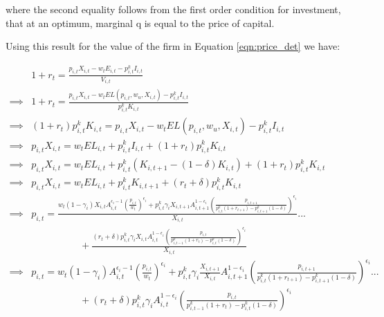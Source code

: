 \documentclass[letterpaper,12pt]{article}
\theoremstyle{definition}
\begin{document}
\begin{spacing}{1.5}
\noindent\noindent where the second equality follows from the first order condition for investment, that at an optimum, marginal q is equal to the price of capital.


Using this result for the value of the firm in Equation \ref{eqn:price_det} we have:

\begin{equation}
\label{eqn:price_det2}
\begin{split}
&  1+r_{t} = \frac{ p_{i,t}X_{i,t} - w_{t}E_{i,t} - p^{k}_{i,t}I_{i,t}}{V_{i,t}} \\
\implies & 1+r_{t} =  \frac{ p_{i,t}X_{i,t} - w_{t}EL(p_{i,t},w_{u},X_{i,t}) - p^{k}_{i,t}I_{i,t}}{p^{k}_{i,t}K_{i,t}} \\
\implies & (1+r_{t})p^{k}_{i,t}K_{i,t} =  p_{i,t}X_{i,t} - w_{t}EL(p_{i,t},w_{u},X_{i,t}) - p^{k}_{i,t}I_{i,t} \\
\implies & p_{i,t}X_{i,t} = w_{t}EL_{i,t} + p^{k}_{i,t}I_{i,t} +  (1+r_{t})p^{k}_{i,t}K_{i,t} \\
\implies & p_{i,t}X_{i,t} = w_{t}EL_{i,t}+ p^{k}_{i,t}(K_{i,t+1} - (1-\delta)K_{i,t}) +  (1+r_{t})p^{k}_{i,t}K_{i,t} \\
\implies & p_{i,t}X_{i,t} = w_{t}EL_{i,t} + p^{k}_{i,t}K_{i,t+1}+  (r_{t}+\delta)p^{k}_{i,t}K_{i,t} \\
\implies & p_{i,t}= \frac{w_{t}(1-\gamma_{i})X_{i,t}A_{i,t}^{\epsilon_{i}-1}\left( \frac{ p_{i,t}}{w_{t}}\right)^{\epsilon_{i}} + p^{k}_{i,t} \gamma_{i}X_{i,t+1}A_{i,t+1}^{1-\epsilon_{i}} \left(\frac{p_{i,t+1}}{p^{k}_{i,t}(1+r_{t+1}) - p^{k}_{i,t+1}(1-\delta)} \right)^{\epsilon_{i}}}{X_{i,t} } ... \\
& \quad\quad\quad\quad\quad + \frac{ (r_{t}+\delta)p^{k}_{i,t}\gamma_{i}X_{i,t}A_{i,t}^{1-\epsilon_{i}} \left(\frac{p_{i,t}}{p^{k}_{i,t-1}(1+r_{t}) - p^{k}_{i,t}(1-\delta)} \right)^{\epsilon_{i}}}{X_{i,t} } \\
\implies & p_{i,t}= w_{t}(1-\gamma_{i})A_{i,t}^{\epsilon_{i}-1}\left( \frac{ p_{i,t}}{w_{t}}\right)^{\epsilon_{i}} + p^{k}_{i,t} \gamma_{i}\frac{X_{i,t+1}}{X_{i,t}}A_{i,t+1}^{1-\epsilon_{i}} \left(\frac{p_{i,t+1}}{p^{k}_{i,t}(1+r_{t+1}) - p^{k}_{i,t+1}(1-\delta)} \right)^{\epsilon_{i}} ... \\
& \quad\quad\quad\quad\quad +  (r_{t}+\delta)p^{k}_{i,t}\gamma_{i}A_{i,t}^{1-\epsilon_{i}} \left(\frac{p_{i,t}}{p^{k}_{i,t-1}(1+r_{t}) - p^{k}_{i,t}(1-\delta)} \right)^{\epsilon_{i}}
\end{split}
\end{equation}


\end{spacing}
\end{document}
